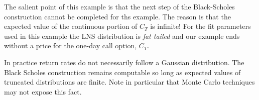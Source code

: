 The salient point of this example is that the next step of the Black-Scholes construction cannot be completed for ths example. The reason is that the expected value of the continuous portion of $C_T$ is infinite! For the fit parameters used in this example the LNS distribution is \emph{fat tailed} and our example ends without a price for the one-day call option, $C_T$.

In practice return rates do not necessarily follow a Gaussian distribution. The Black Scholes construction remains computable so long as expected values of truncated distributions are finite. Note in particular that Monte Carlo techniques may not expose this fact.
